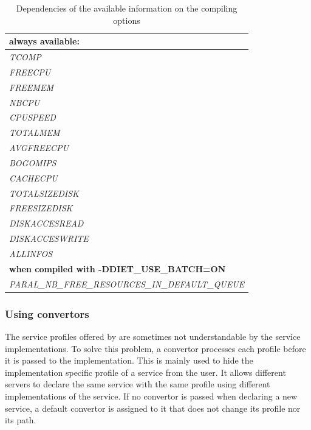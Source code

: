 \begin{table}[h]
 \tiny
 \centering
 \begin{tabular}[c]{|l|}\hline
  \textbf{always available:} \\[5pt]
  \hline
  \hline
 \textit{TCOMP        } \\[5pt]
 \hline 
  \textit{FREECPU      } \\[5pt]
  \hline
  \textit{FREEMEM      } \\[5pt]
  \hline
  \textit{NBCPU        } \\[5pt]
  \hline
  \textit{CPUSPEED     } \\[5pt]
  \hline
  \textit{TOTALMEM     } \\[5pt]
  \hline
  \textit{AVGFREECPU   } \\[5pt]
  \hline
  \textit{BOGOMIPS     } \\[5pt]
  \hline
  \textit{CACHECPU     } \\[5pt]
  \hline
  \textit{TOTALSIZEDISK} \\[5pt]
  \hline
  \textit{FREESIZEDISK } \\[5pt]
  \hline
  \textit{DISKACCESREAD} \\[5pt]
  \hline
  \textit{DISKACCESWRITE} \\[5pt]
  \hline
  \textit{ALLINFOS     } \\[5pt]
  \hline
  \hline
  \textbf{when compiled with -DDIET\_USE\_BATCH=ON} \\[5pt]  
  \textit{PARAL\_NB\_FREE\_RESOURCES\_IN\_DEFAULT\_QUEUE} \\[5pt] 
  \hline
 \end{tabular}
 \caption{Dependencies of the available information on the
 compiling options}
 \label{t:depcompil}
\end{table}

\subsubsection{Using convertors}

The service profiles offered by \diet are sometimes not understandable by the
service implementations. To solve this problem, a convertor processes each
profile before it is passed to the implementation. This is mainly used to hide
the implementation specific profile of a service from the user. It allows
different servers to declare the same service with the same profile using
different implementations of the service. If no convertor
is passed when declaring a new service, a default convertor is assigned to it
that does not change its profile nor its path.

